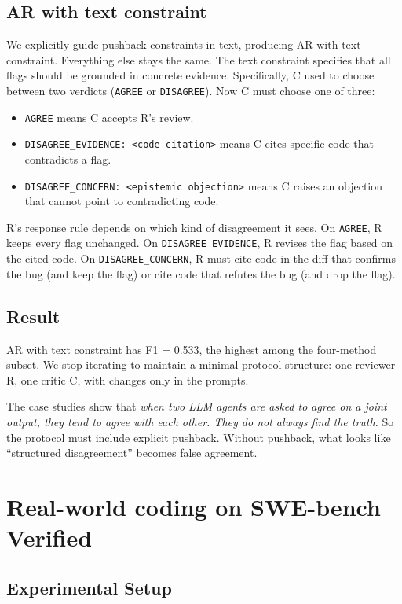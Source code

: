 \documentclass{article}
\begin{document}
\subsection{AR with text constraint}
\label{sec:prbench-v2}

We explicitly guide pushback constraints in text, producing AR with text constraint. Everything else stays the same. The text constraint specifies that all flags should be grounded in concrete evidence. Specifically,
C used to choose between two verdicts (\texttt{AGREE} or \texttt{DISAGREE}). Now C must
choose one of three:
\begin{itemize}[leftmargin=*,itemsep=0pt]
\item \texttt{AGREE} means C accepts R's review.
\item \texttt{DISAGREE\_EVIDENCE: <code citation>} means C cites
specific code that contradicts a flag.
\item \texttt{DISAGREE\_CONCERN: <epistemic objection>} means C raises
an objection that cannot point to contradicting code.
\end{itemize}
R's response rule depends on which kind of disagreement it sees. On
\texttt{AGREE}, R keeps every flag unchanged. On
\texttt{DISAGREE\_EVIDENCE}, R revises the flag based on the cited
code. On \texttt{DISAGREE\_CONCERN}, R must cite code in the diff that
confirms the bug (and keep the flag) or cite code that refutes the bug
(and drop the flag).

\subsection{Result}
AR with text constraint has F1 = 0.533, the highest among the four-method subset. We stop iterating to maintain a minimal protocol structure: one reviewer R, one critic C, with changes only in the prompts.

The case studies show that \emph{when two LLM agents are asked to agree on a
joint output, they tend to agree with each other. They do not always
find the truth.} So the protocol must include explicit pushback.
Without pushback, what looks like ``structured disagreement'' becomes
false agreement.

\section{Real-world coding on SWE-bench Verified}
\label{sec:swebench}

\subsection{Experimental Setup}
\label{sec:swebench-setup}
\end{document}
